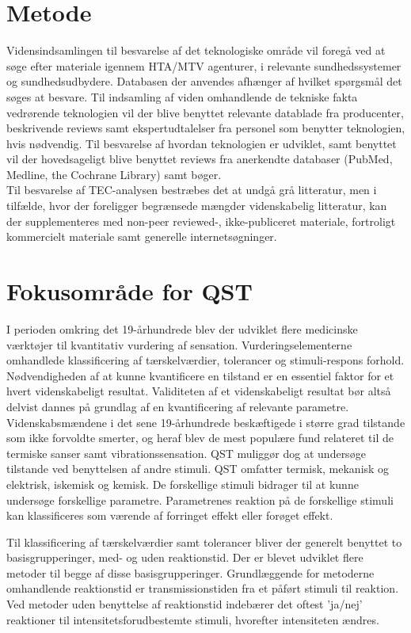 \section{Metode \citep{HTAcore}}
Vidensindsamlingen til besvarelse af det teknologiske område vil foregå ved at søge efter materiale igennem HTA/MTV agenturer, i relevante sundhedssystemer og sundhedsudbydere. Databasen der anvendes afhænger af hvilket spørgsmål det søges at besvare. Til indsamling af viden omhandlende de tekniske fakta vedrørende teknologien vil der blive benyttet relevante datablade fra producenter, beskrivende reviews samt ekspertudtalelser fra personel som benytter teknologien, hvis nødvendig. Til besvarelse af hvordan teknologien er udviklet, samt benyttet vil der hovedsageligt blive benyttet reviews fra anerkendte databaser (PubMed, Medline, the Cochrane Library) samt bøger.  \\
Til besvarelse af TEC-analysen bestræbes det at undgå grå litteratur, men i tilfælde, hvor der foreligger begrænsede mængder videnskabelig litteratur, kan der supplementeres med non-peer reviewed-, ikke-publiceret materiale, fortroligt kommercielt materiale samt generelle internetsøgninger.

\section{Fokusområde for QST}
I perioden omkring det 19-århundrede blev der udviklet flere medicinske værktøjer til kvantitativ vurdering af sensation. Vurderingselementerne omhandlede klassificering af tærskelværdier, tolerancer og stimuli-respons forhold. Nødvendigheden af at kunne kvantificere en tilstand er en essentiel faktor for et hvert videnskabeligt resultat. Validiteten af et videnskabeligt resultat bør altså delvist dannes på grundlag af en kvantificering af relevante parametre. \citep{Yarnitsky2006} Videnskabsmændene i det sene 19-århundrede beskæftigede i større grad tilstande som ikke forvoldte smerter, og heraf blev de mest populære fund relateret til de termiske sanser samt vibrationssensation. \citep{Yarnitsky1997} QST muliggør dog at undersøge tilstande ved benyttelsen af andre stimuli. QST omfatter termisk, mekanisk og elektrisk, iskemisk og kemisk. De forskellige stimuli bidrager til at kunne undersøge forskellige parametre. Parametrenes reaktion på de forskellige stimuli kan klassificeres som værende af forringet effekt eller forøget effekt.

Til klassificering af tærskelværdier samt tolerancer bliver der generelt benyttet to basisgrupperinger, med- og uden reaktionstid. Der er blevet udviklet flere metoder til begge af disse basisgrupperinger. Grundlæggende for metoderne omhandlende reaktionstid er transmissionstiden fra et påført stimuli til reaktion. Ved metoder uden benyttelse af reaktionstid indebærer det oftest 'ja/nej' reaktioner til intensitetsforudbestemte stimuli, hvorefter intensiteten ændres. \citep{Yarnitsky1997} 


